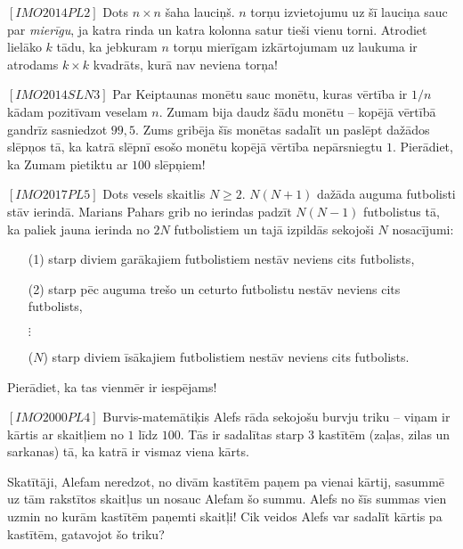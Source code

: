 

%

\renewcommand{\theenumi}{\alph{enumi}}



\noindent
 
\filbreak

\begin{problem}
$[IMO2014PL2]$
Dots $n \times n$ šaha lauciņš. $n$ torņu izvietojumu uz šī lauciņa sauc par \textit{mierīgu}, ja katra rinda un katra kolonna satur tieši vienu torni. Atrodiet lielāko $k$ tādu, ka jebkuram $n$ torņu mierīgam izkārtojumam uz laukuma ir atrodams  $k \times k$  kvadrāts, kurā nav neviena torņa!
\end{problem}


\begin{problem}
$[IMO2014SLN3]$
Par Keiptaunas monētu sauc monētu, kuras vērtība ir $1/n$ kādam pozitīvam veselam $n$. Zumam bija daudz šādu monētu – kopējā vērtībā gandrīz sasniedzot $99,5$. Zums gribēja šīs monētas sadalīt un paslēpt dažādos slēpņos tā, ka katrā slēpnī esošo monētu kopējā vērtība nepārsniegtu $1$. Pierādiet, ka Zumam pietiktu ar $100$ slēpņiem!
\end{problem}

\begin{problem}
$[IMO2017PL5]$
Dots vesels skaitlis $N \geqslant 2$. $N(N+1)$ dažāda auguma futbolisti stāv ierindā. Marians Pahars grib no ierindas padzīt $N(N-1)$ futbolistus tā, ka paliek jauna ierinda no $2N$  futbolistiem un tajā izpildās sekojoši $N$ nosacījumi:
\begin{itemize}
\item[(1)]
starp diviem garākajiem futbolistiem nestāv neviens cits futbolists,
\item[(2)]
starp pēc auguma trešo un ceturto futbolistu nestāv neviens cits futbolists,
\item[$\vdots$]
\item[($N$)]
starp diviem īsākajiem futbolistiem nestāv neviens cits futbolists.
\end{itemize}
Pierādiet, ka tas vienmēr ir iespējams!
\end{problem}
\begin{problem}
$[IMO2000PL4]$
Burvis-matemātiķis Alefs rāda sekojošu burvju triku – viņam ir kārtis ar skaitļiem no $1$ līdz $100$. Tās ir sadalītas starp $3$ kastītēm (zaļas, zilas un sarkanas) tā, ka katrā ir vismaz viena kārts. 

Skatītāji, Alefam neredzot, no divām kastītēm paņem pa vienai kārtij, sasummē uz tām rakstītos skaitļus un nosauc Alefam šo summu. Alefs no šīs summas vien uzmin no kurām kastītēm paņemti skaitļi! Cik veidos Alefs var sadalīt kārtis pa kastītēm, gatavojot šo triku?
\end{problem}

